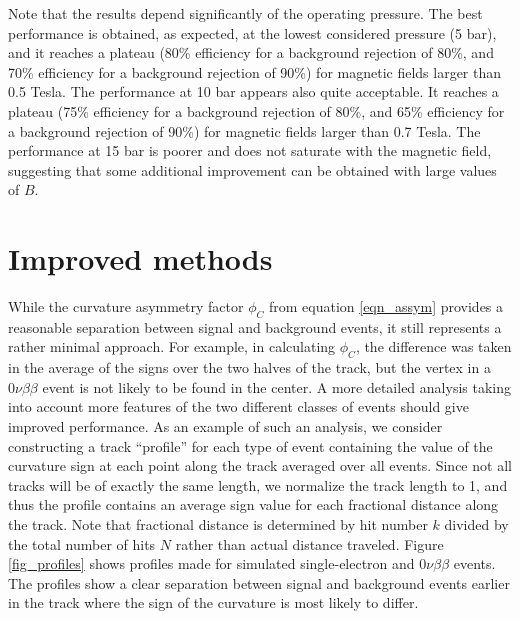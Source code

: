 \documentclass{JINST}
\begin{document}
Note that the results depend significantly of the operating pressure. The best performance is obtained, as expected, at the lowest considered pressure (5 bar), and it reaches a plateau (80\% efficiency for a background rejection of 80\%, and 70\% efficiency for a background rejection of 90\%) for magnetic fields larger than 0.5 Tesla. The performance at 10 bar appears also quite acceptable. It reaches a plateau (75\% efficiency for a background rejection of 80\%, and 65\% efficiency for a background rejection of 90\%) for magnetic fields larger than 0.7 Tesla. The performance at 15 bar is poorer and does not saturate with the magnetic field, suggesting that some additional improvement can be obtained with large values of $B$. 

\section{Improved methods}
While the curvature asymmetry factor $\phi_C$ from equation \ref{eqn_assym} provides a reasonable separation between signal and background events, it still represents a rather minimal approach.  For example, in calculating $\phi_C$, the difference was taken in the average of the signs over the two halves of the track, but the vertex in a $0\nu\beta\beta$ event is not likely to be found in the center.  A more detailed analysis taking into account more features of the two different classes of events should give improved performance.  As an example of such an analysis, we consider constructing a track ``profile'' for each type of event containing the value of the curvature sign at each point along the track averaged over all events.  Since not all tracks will be of exactly the same length, we normalize the track length to 1, and thus the profile contains an average sign value for each fractional distance along the track.  Note that fractional distance is determined by hit number $k$ divided by the total number of hits $N$ rather than actual distance traveled.  Figure \ref{fig_profiles} shows profiles made for simulated single-electron and $0\nu\beta\beta$ events.  The profiles show a clear separation between signal and background events earlier in the track where the sign of the curvature is most likely to differ.
\end{document}
